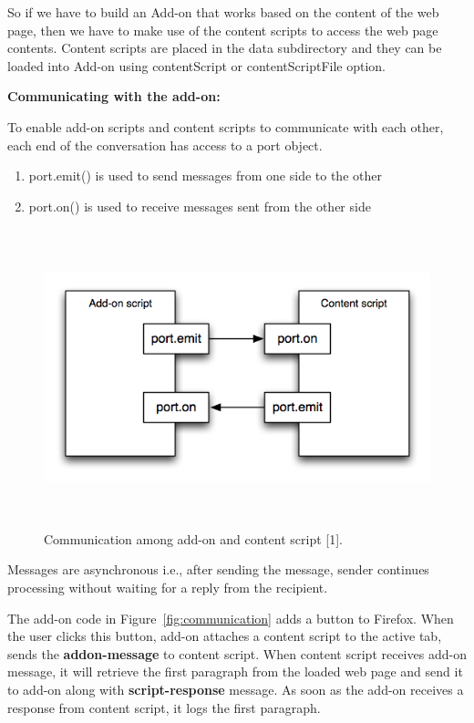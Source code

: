 So if we have to build an Add-on that works based on the content of the web page, then we have to make use of the content scripts to access the web page contents. Content scripts are placed in the data subdirectory and they can be loaded into Add-on using contentScript or contentScriptFile option.

\textbf{Communicating with the add-on:}

To enable add-on scripts and content scripts to communicate with each other, each end of the conversation has access to a port object.
\begin{enumerate}
\item port.emit() is used to send messages from one side to the other 
\item port.on() is used to receive messages sent from the other side
\end{enumerate}

\begin{figure}
  \centering
      \includegraphics[width=16cm, height=8.65cm]{content-scripting-overview.png}
    \caption[Communication among add-on and content script]{Communication among add-on and content script [1].}
    \label{fig:content-scripting-overview}
\end{figure}

Messages are asynchronous i.e., after sending the message, sender continues processing without waiting for a reply from the recipient.

The add-on code in Figure~\ref{fig:communication} adds a button to Firefox. When the user clicks this button, add-on attaches a content script to the active tab, sends the \textbf{addon-message} to content script. When content script receives add-on message, it will retrieve the first paragraph from the loaded web page and send it to add-on along with \textbf{script-response} message. As soon as the add-on receives a response from content script, it logs the first paragraph.

